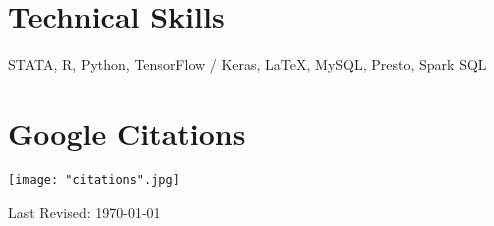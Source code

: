 \documentclass[10.5pt,letterpaper,sans]{moderncv}        %
\begin{document}
\section{Technical Skills}

STATA, R, Python, TensorFlow / Keras, \LaTeX, MySQL, Presto, Spark SQL\newline

\section{Google Citations}

\begin{minipage}{.5\linewidth}
   \texttt{[image: "citations".jpg]}
\end{minipage}

\bigskip

Last Revised: \today
\end{document}
